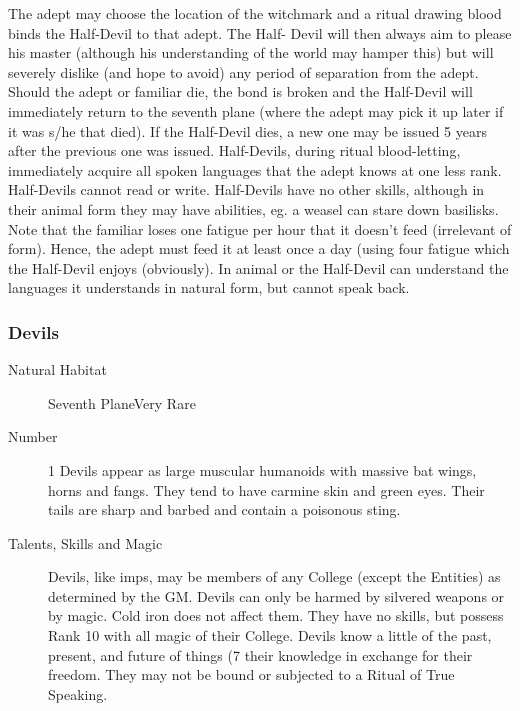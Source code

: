\begin{multicols}{2}
\begin{description}
The adept may choose the location of the witchmark and a ritual
drawing blood binds the Half-Devil to that adept.  The Half- Devil
will then always aim to please his master (although his understanding
of the world may hamper this) but will severely dislike (and hope to
avoid) any period of separation from the adept.  Should the adept or
familiar die, the bond is broken and the Half-Devil will immediately
return to the seventh plane (where the adept may pick it up later if
it was s/he that died).  If the Half-Devil dies, a new one may be
issued 5 years after the previous one was issued.  Half-Devils, during
ritual blood-letting, immediately acquire all spoken languages that
the adept knows at one less rank.  Half-Devils cannot read or write.
Half-Devils have no other skills, although in their animal form they
may have abilities, eg.  a weasel can stare down basilisks.  Note that
the familiar loses one fatigue per hour that it doesn't feed
(irrelevant of form).  Hence, the adept must feed it at least once a
day (using four fatigue which the Half-Devil enjoys (obviously).  In
animal or the Half-Devil can understand the languages it understands
in natural form, but cannot speak back.

\end{description}

\subsubsection{Devils}

\begin{description}
\item[Natural Habitat]Seventh PlaneVery Rare

\item[Number] 1
Devils appear as large muscular humanoids with
massive bat wings, horns and fangs.  They tend to have carmine skin
and green eyes.  Their tails are sharp and barbed and contain a
poisonous sting.

\item[Talents, Skills and Magic]Devils, like imps, may be members of any College (except the
Entities) as determined by the GM. Devils can only be harmed by
silvered weapons or by magic.  Cold iron does not affect them.  They
have no skills, but possess Rank 10 with all magic of their College.
Devils know a little of the past, present, and future of things
(7%
their knowledge in exchange for their freedom.  They may not be bound
or subjected to a Ritual of True Speaking.


\end{description}
\end{multicols}
